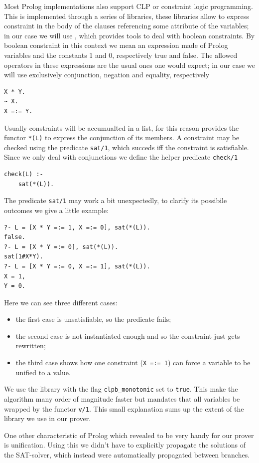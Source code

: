 \documentclass[a4paper, 12pt, english]{report}
\begin{document}
Most Prolog implementations also support CLP or constraint logic programming.
This is implemented through a series of libraries, these libraries allow to express constraint in the body of the clauses referencing some attribute of the variables;
in our case we will use \CLPB \cite{clpb}, which provides tools to deal with boolean constraints.
By boolean constraint in this context we mean an expression made of Prolog variables and the constants 1 and 0, respectively true and false.
The allowed operators in these expressions are the usual ones one would expect; in our case we will use exclusively conjunction, negation and equality, respectively
\begin{verbatim}
X * Y.
~ X.
X =:= Y.
\end{verbatim}

Usually constraints will be accumualted in a list, for this reason \CLPB provides the functor \texttt{*(L)} to express the conjunction of its members.
A constraint may be checked using the predicate \texttt{sat/1}, which succeds iff the constraint is satisfiable.
Since we only deal with conjunctions we define the helper predicate \texttt{check/1}
\begin{verbatim}
check(L) :-
	sat(*(L)).
\end{verbatim}
The predicate \texttt{sat/1} may work a bit unexpectedly, to clarify its possibile outcomes we give a little example:
\begin{verbatim}
?- L = [X * Y =:= 1, X =:= 0], sat(*(L)).
false.
?- L = [X * Y =:= 0], sat(*(L)).
sat(1#X*Y).
?- L = [X * Y =:= 0, X =:= 1], sat(*(L)).
X = 1,
Y = 0.
\end{verbatim}
Here we can see three different cases:
\begin{itemize}
	\item the first case is unsatisfiable, so the predicate fails;
	\item the second case is not instantiated enough and so the constraint just gets rewritten;
	\item the third case shows how one constraint (\texttt{X =:= 1}) can force a variable to be unified to a value.
\end{itemize}
We use the library with the flag \texttt{clpb\_monotonic} set to \texttt{true}.
This make the algorithm many order of magnitude faster but mandates that all variables be wrapped by the functor \texttt{v/1}.
This small explanation sums up the extent of the library we use in our prover.

One other characteristic of Prolog which revealed to be very handy for our prover is unification.
Using this we didn't have to explicitly propagate the solutions of the SAT-solver, which instead were automatically propagated between branches.
\end{document}
